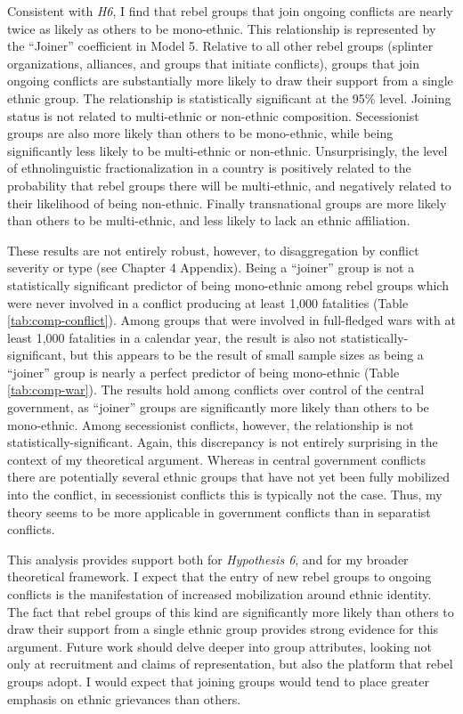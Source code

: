 \documentclass[12pt,]{book}
\theoremstyle{definition}
\theoremstyle{definition}
\theoremstyle{definition}
\theoremstyle{remark}
\begin{document}
Consistent with \emph{H6}, I find that rebel groups that join ongoing
conflicts are nearly twice as likely as others to be mono-ethnic. This
relationship is represented by the ``Joiner'' coefficient in Model 5.
Relative to all other rebel groups (splinter organizations, alliances,
and groups that initiate conflicts), groups that join ongoing conflicts
are substantially more likely to draw their support from a single ethnic
group. The relationship is statistically significant at the 95\% level.
Joining status is not related to multi-ethnic or non-ethnic composition.
Secessionist groups are also more likely than others to be mono-ethnic,
while being significantly less likely to be multi-ethnic or non-ethnic.
Unsurprisingly, the level of ethnolinguistic fractionalization in a
country is positively related to the probability that rebel groups there
will be multi-ethnic, and negatively related to their likelihood of
being non-ethnic. Finally transnational groups are more likely than
others to be multi-ethnic, and less likely to lack an ethnic
affiliation.

These results are not entirely robust, however, to disaggregation by
conflict severity or type (see Chapter 4 Appendix). Being a ``joiner''
group is not a statistically significant predictor of being mono-ethnic
among rebel groups which were never involved in a conflict producing at
least 1,000 fatalities (Table \ref{tab:comp-conflict}). Among groups
that were involved in full-fledged wars with at least 1,000 fatalities
in a calendar year, the result is also not statistically-significant,
but this appears to be the result of small sample sizes as being a
``joiner'' group is nearly a perfect predictor of being mono-ethnic
(Table \ref{tab:comp-war}). The results hold among conflicts over
control of the central government, as ``joiner'' groups are
significantly more likely than others to be mono-ethnic. Among
secessionist conflicts, however, the relationship is not
statistically-significant. Again, this discrepancy is not entirely
surprising in the context of my theoretical argument. Whereas in central
government conflicts there are potentially several ethnic groups that
have not yet been fully mobilized into the conflict, in secessionist
conflicts this is typically not the case. Thus, my theory seems to be
more applicable in government conflicts than in separatist conflicts.

This analysis provides support both for \emph{Hypothesis 6}, and for my
broader theoretical framework. I expect that the entry of new rebel
groups to ongoing conflicts is the manifestation of increased
mobilization around ethnic identity. The fact that rebel groups of this
kind are significantly more likely than others to draw their support
from a single ethnic group provides strong evidence for this argument.
Future work should delve deeper into group attributes, looking not only
at recruitment and claims of representation, but also the platform that
rebel groups adopt. I would expect that joining groups would tend to
place greater emphasis on ethnic grievances than others.
\end{document}
